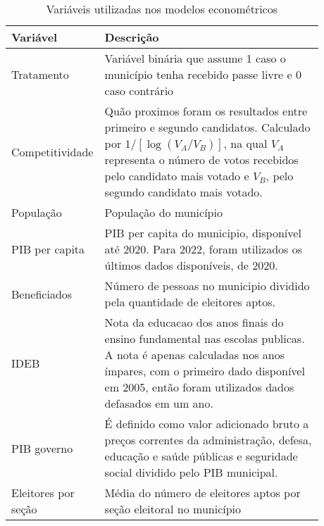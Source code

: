 \begin{table}
    \centering
    \caption{Variáveis utilizadas nos modelos econométricos}

    \begin{tabular}{m{0.18\linewidth}|m{0.7\linewidth}}
        Variável & Descrição \\
        \toprule
        Tratamento & Variável binária que assume 1 caso o município tenha recebido passe livre e 0 caso contrário \\
        \midrule
        Competitividade & Quão proximos foram os resultados entre primeiro e segundo candidatos. Calculado por $1/[\log({V_A/V_B})]$, na qual $V_A$ representa o número de votos recebidos pelo candidato mais votado e $V_B$, pelo segundo candidato mais votado.\footnotemark \\
        \midrule
        População & População do município \\
        \midrule
        PIB per capita & PIB per capita do municipio, disponível até 2020. Para 2022, foram utilizados os últimos dados disponíveis, de 2020. \\
        \midrule
        Beneficiados & Número de pessoas no municipio dividido pela quantidade de eleitores aptos. \\
        \midrule
        IDEB & Nota da educacao dos anos finais do ensino fundamental nas escolas publicas. A nota é apenas calculadas nos anos ímpares, com o primeiro dado disponível em 2005, então foram utilizados dados defasados em um ano. \\
        \midrule
        PIB governo & É definido como valor adicionado bruto a preços correntes da administração, defesa, educação e saúde públicas e seguridade social dividido pelo PIB municipal. \\
        \midrule
        Eleitores por seção & Média do número de eleitores aptos por seção eleitoral no município

    \end{tabular}

    \label{tab_variaveis}
\end{table}


